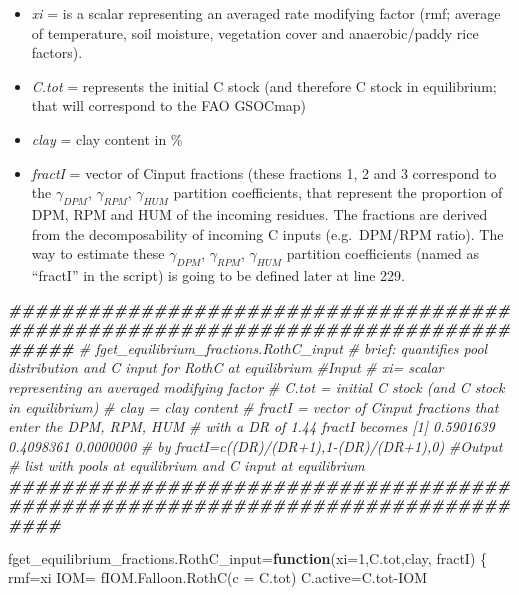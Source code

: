 \documentclass[
  10pt,
  b5paper,
]{book}
\newenvironment{Shaded}{\begin{snugshade}}{\end{snugshade}}
\newcommand{\AttributeTok}[1]{\textcolor[rgb]{0.77,0.63,0.00}{#1}}
\newcommand{\CommentTok}[1]{\textcolor[rgb]{0.56,0.35,0.01}{\textit{#1}}}
\newcommand{\ControlFlowTok}[1]{\textcolor[rgb]{0.13,0.29,0.53}{\textbf{#1}}}
\newcommand{\DecValTok}[1]{\textcolor[rgb]{0.00,0.00,0.81}{#1}}
\newcommand{\DocumentationTok}[1]{\textcolor[rgb]{0.56,0.35,0.01}{\textbf{\textit{#1}}}}
\newcommand{\FunctionTok}[1]{\textcolor[rgb]{0.00,0.00,0.00}{#1}}
\newcommand{\NormalTok}[1]{#1}
\newcommand{\OtherTok}[1]{\textcolor[rgb]{0.56,0.35,0.01}{#1}}
\newcommand{\SpecialCharTok}[1]{\textcolor[rgb]{0.00,0.00,0.00}{#1}}
\providecommand{\tightlist}{%
  \setlength{\itemsep}{0pt}\setlength{\parskip}{0pt}}
\begin{document}
\begin{itemize}
\tightlist
\item
  \emph{xi} = is a scalar representing an averaged rate modifying factor (rmf; average of temperature, soil moisture, vegetation cover and anaerobic/paddy rice factors).\\
\item
  \emph{C.tot} = represents the initial C stock (and therefore C stock in equilibrium; that will correspond to the FAO GSOCmap)\\
\item
  \emph{clay} = clay content in \%
\item
  \emph{fractI} = vector of Cinput fractions (these fractions 1, 2 and 3 correspond to the \(\gamma_{DPM}\), \(\gamma_{RPM}\), \(\gamma_{HUM}\) partition coefficients, that represent the proportion of DPM, RPM and HUM of the incoming residues. The fractions are derived from the decomposability of incoming C inputs (e.g.~DPM/RPM ratio). The way to estimate these \(\gamma_{DPM}\), \(\gamma_{RPM}\), \(\gamma_{HUM}\) partition coefficients (named as ``fractI'' in the script) is going to be defined later at line 229.
\end{itemize}

\begin{Shaded}
\begin{Highlighting}[]
\DocumentationTok{\#\#\#\#\#\#\#\#\#\#\#\#\#\#\#\#\#\#\#\#\#\#\#\#\#\#\#\#\#\#\#\#\#\#\#\#\#\#\#\#\#\#\#\#\#\#\#\#\#\#\#\#\#\#\#\#\#\#\#\#\#\#\#\#\#\#\#\#\#\#\#\#\#\#\#\#\#\#\#\#\#}
\CommentTok{\# fget\_equilibrium\_fractions.RothC\_input }
\CommentTok{\# brief: quantifies pool distribution and C input for RothC at equilibrium}
\CommentTok{\#Input}
\CommentTok{\# xi= scalar representing an averaged modifying factor}
\CommentTok{\# C.tot = initial C stock (and C stock in equilibrium)}
\CommentTok{\# clay = clay content}
\CommentTok{\# fractI = vector of Cinput fractions that enter the DPM, RPM, HUM  }
\CommentTok{\#          with a DR of 1.44 fractI becomes [1] 0.5901639 0.4098361 0.0000000}
\CommentTok{\#          by fractI=c((DR)/(DR+1),1{-}(DR)/(DR+1),0)}
\CommentTok{\#Output}
\CommentTok{\# list with pools at equilibrium and C input at equilibrium}
\DocumentationTok{\#\#\#\#\#\#\#\#\#\#\#\#\#\#\#\#\#\#\#\#\#\#\#\#\#\#\#\#\#\#\#\#\#\#\#\#\#\#\#\#\#\#\#\#\#\#\#\#\#\#\#\#\#\#\#\#\#\#\#\#\#\#\#\#\#\#\#\#\#\#\#\#\#\#\#\#\#\#\#\#}

\NormalTok{fget\_equilibrium\_fractions.RothC\_input}\OtherTok{=}\ControlFlowTok{function}\NormalTok{(}\AttributeTok{xi=}\DecValTok{1}\NormalTok{,C.tot,clay, fractI)}
\NormalTok{\{   }
\NormalTok{  rmf}\OtherTok{=}\NormalTok{xi}
\NormalTok{  IOM}\OtherTok{=} \FunctionTok{fIOM.Falloon.RothC}\NormalTok{(}\AttributeTok{c =}\NormalTok{ C.tot)}
\NormalTok{  C.active}\OtherTok{=}\NormalTok{C.tot}\SpecialCharTok{{-}}\NormalTok{IOM }
\end{Highlighting}
\end{Shaded}
\end{document}

